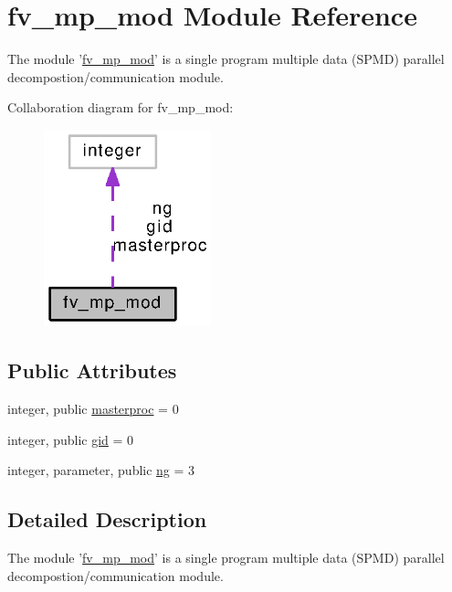 \section{fv\-\_\-mp\-\_\-mod Module Reference}
\label{classfv__mp__mod}


The module '\hyperlink{classfv__mp__mod}{fv\-\_\-mp\-\_\-mod}' is a single program multiple data (S\-P\-M\-D) parallel decompostion/communication module.  




Collaboration diagram for fv\-\_\-mp\-\_\-mod\-:
\nopagebreak
\begin{figure}[H]
\begin{center}
\leavevmode
\includegraphics[width=137pt]{classfv__mp__mod__coll__graph}
\end{center}
\end{figure}
\subsection*{Public Attributes}
\begin{DoxyCompactItemize}
\item 
integer, public \hyperlink{classfv__mp__mod_a5040ccdc5ac106793b009fe1ec4bf5d1}{masterproc} = 0
\item 
integer, public \hyperlink{classfv__mp__mod_a30b2cd26ed97df412ac7618005f079a5}{gid} = 0
\item 
integer, parameter, public \hyperlink{classfv__mp__mod_ac41de456a8350a1ffd448c11ad07f923}{ng} = 3
\end{DoxyCompactItemize}


\subsection{Detailed Description}
The module '\hyperlink{classfv__mp__mod}{fv\-\_\-mp\-\_\-mod}' is a single program multiple data (S\-P\-M\-D) parallel decompostion/communication module. 

